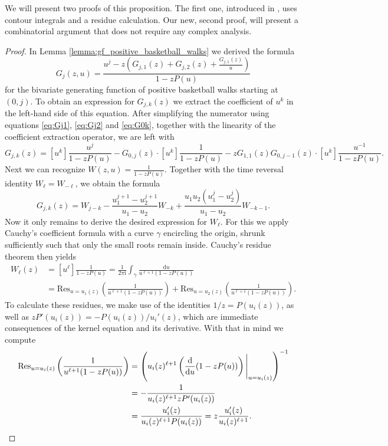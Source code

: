 We will present two proofs of this proposition. The first one, introduced in \cite{Basketball}, uses contour integrals and a residue calculation.
Our new, second proof, will present a combinatorial argument that does not require any complex analysis.

\begin{proof}
  In Lemma \ref{lemma:gf_positive_basketball_walks} we derived the formula
  $$
  G_{j}(z,u) = \frac{u^{j} - z\left(G_{j,1}(z) + G_{j,2}(z) + \frac{G_{j,1}(z)}{u}\right)}{1-zP(u)}
  $$
  for the bivariate generating function of positive basketball walks starting at $(0,j)$. To obtain an expression for $G_{j,k}(z)$ we extract the coefficient of $u^{k}$ in the left-hand side of this equation. After simplifying the numerator using equations \eqref{eq:Gj1}, \eqref{eq:Gj2} and \eqref{eq:G0k}, together with the linearity of the coefficient extraction operator, we are left with
  $$
  G_{j,k}(z) = [u^{k}] \frac{u^{j}}{1-zP(u)} - G_{0,j}(z) \cdot [u^{k}]\frac{1}{1 - zP(u)} - z G_{1,1}(z) G_{0,j-1}(z) \cdot [u^{k}]\frac{u^{-1}}{1-zP(u)}.
  $$
  Next we can recognize $W(z,u) = \frac{1}{1-zP(u)}$. Together with the time reversal identity $W_{\ell} = W_{-\ell}$, we obtain the formula
  $$
  G_{j,k}(z) = W_{j-k} -\frac{u_{1}^{j+1}-u_{2}^{j+1}}{u_{1}-u_{2}}W_{-k} + \frac{u_{1}u_{2}(u_{1}^{j}-u_{2}^{j})}{u_{1}-u_{2}}W_{-k-1}.
  $$
  Now it only remains to derive the desired expression for $W_{\ell}$. For this we apply Cauchy's coefficient formula with a curve $\gamma$ encircling the origin, shrunk sufficiently such that only the small roots remain inside. Cauchy's residue theorem then yields
  \begin{align*}
  W_{\ell}(z) &= [u^{\ell}] \frac{1}{1-zP(u)}
  = \frac{1}{2\pi \mathrm{i}}\int_{\gamma} \frac{\mathrm{d}u}{u^{\ell+1}(1-zP(u))} \\
  &= \mathrm{Res}_{u=u_{1}(z)}\left(\frac{1}{u^{\ell+1}(1-zP(u))}\right) + \mathrm{Res}_{u=u_{2}(z)}\left(\frac{1}{u^{\ell+1}(1-zP(u))}\right).
  \end{align*}
  To calculate these residues, we make use of the identities $1/z = P(u_i(z))$, as well as $zP'(u_i(z)) = - P(u_i(z))/u_i'(z)$, which are immediate consequences of the kernel equation and its derivative. With that in mind we compute
  \begin{align*}
    \mathrm{Res}_{u=u_{i}(z)}\left(\frac{1}{u^{\ell+1}(1-zP(u))}\right)
    &= \left(u_{i}(z)^{\ell+1} \left(\frac{\mathrm{d}}{\mathrm{d}u}(1-zP(u))\right)\Bigg|_{u=u_{i}(z)}\right)^{-1}\\
    &= -\frac{1}{u_{i}(z)^{\ell+1}zP'(u_{i}(z))} \\
    &= \frac{u_{i}'(z)}{u_{i}(z)^{\ell+1}P(u_{i}(z))}
    = z\frac{u_{i}'(z)}{u_{i}(z)^{\ell+1}}. \qedhere
  \end{align*} 
\end{proof}

